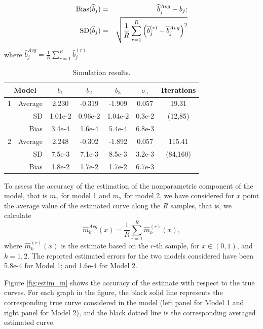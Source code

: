 \documentclass[sn-mathphys]{sn-jnl}%
\theoremstyle{thmstyleone}%
\theoremstyle{thmstyletwo}%
\theoremstyle{thmstylethree}%
\begin{document}
\begin{eqnarray}
	{\rm Bias}(\widehat{b}_j)&=& \widehat{b}_{j}^{Avg}-b_j ;\label{eq:bias_sim}\\
	{\rm SD} (\widehat{b}_j)&=& \sqrt{\frac{1}{R}\sum_{r=1}^R \left(\widehat{b}_j^{(r)}-\widehat{b}_{j}^{Avg}\right)^2} \label{eq:sd_sim} 
\end{eqnarray}
where $\widehat{b}_{j}^{Avg} =\frac{1}{R}\sum_{r=1}^R \widehat{b}_j^{(r)}$
{\small{
		\begin{table}[!t]
			\begin{center}
			
				\label{tab:simu}
				\begin{tabular}{|r|r|c|c|c|c|c|}\hline
					\multicolumn{2}{|c}{Model}&\multicolumn{1}{|c}{$b_1$}&\multicolumn{1}{|c}{$b_2$}&\multicolumn{1}{|c}{$b_3$}&\multicolumn{1}{|c}{$\sigma_{\gamma}$} & \multicolumn{1}{|c|}{Iterations} \\ \hline
					1        & Average     & 2.230  &-0.319    & -1.909   & 0.057   & 19.31  \\
					& SD           & 1.01e-2 & 0.96e-2 & 1.04e-2  & 0.3e-2  & (12,85)                \\
					& Bias           & 3.4e-4  & 1.6e-4  & 5.4e-4   & 6.8e-3  &                 \\ \hline
					
					2       & Average     & 2.248   &-0.302   & -1.892   & 0.057   & 115.41  \\
					& SD           & 7.5e-3  & 7.1e-3  & 8.5e-3   & 3.2e-3  & (84,160) \\
					& Bias           & 1.8e-2  & 1.7e-2  & 1.7e-2   & 6.7e-3  &           \\ \hline
				\end{tabular}
				\caption{Simulation results.}
			\end{center}
		\end{table}
}}


To assess the accuracy of the estimation of the nonparametric component of the model, that is $m_1$ for model 1 and $m_2$ for model 2, we have considered for $x$ point the average value of the estimated curve along the $R$ samples, that is, we calculate
\[
{\widehat{m}}_{k}^{Avg}(x) =\frac{1}{R}\sum_{r=1}^R \widehat{m}_k^{(r)}(x),
\]
where $\widehat{m}_k^{(r)}(x)$ is the estimate based on the $r$-th sample, for $x \in (0,1)$, and $k=1,2$. The reported estimated errors for the two models considered have been  5.8e-4 for Model 1; and 1.6e-4 for Model 2. 

Figure \ref{fig:estim_m} shows the accuracy of the estimate with respect to the true curves. For each graph in the figure, the black solid line represents the corresponding true curve considered in the model (left panel for Model 1 and right panel for Model 2), and the black dotted line is the corresponding averaged estimated curve.
\end{document}
